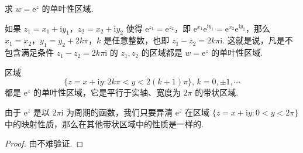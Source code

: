\documentclass[../../main.tex]{subfiles}%
\begin{document}
\begin{proposition}\label{proposition:复变函数的指数函数的单叶性区域}
求 \( w = \mathrm{e}^z \) 的单叶性区域.
\end{proposition}
\begin{solution}

如果 \( z_1 = x_1 + \mathrm{i}y_1 \)，\( z_2 = x_2 + \mathrm{i}y_2 \) 使得 \( \mathrm{e}^{z_1} = \mathrm{e}^{z_2} \)，即 \( \mathrm{e}^{x_1} \mathrm{e}^{\mathrm{i}y_1} = \mathrm{e}^{x_2} \mathrm{e}^{\mathrm{i}y_2} \)，那么 \( x_1 = x_2 \)，\( y_1 = y_2 + 2k\pi \)，\( k \) 是任意整数，也即 \( z_1 - z_2 = 2k\pi \mathrm{i} \). 这就是说，凡是不包含满足条件 \( z_1 - z_2 = 2k\pi \mathrm{i} \) 的 \( z_1, z_2 \) 的区域都是 \( w = \mathrm{e}^z \) 的单叶性区域. 

\end{solution}

\begin{proposition}
区域
\[
\{ z = x + \mathrm{i}y : 2k\pi < y < 2(k + 1)\pi \}, \, k = 0, \pm 1, \cdots
\]
都是 \( \mathrm{e}^z \) 的单叶性区域，它是平行于实轴、宽度为 \( 2\pi \) 的带状区域.
\end{proposition}
\begin{note}
由于 \( \mathrm{e}^z \) 是以 \( 2\pi \mathrm{i} \) 为周期的函数，我们只要弄清 \( \mathrm{e}^z \) 在区域 \( \{ z = x + \mathrm{i}y : 0 < y < 2\pi \} \) 中的映射性质，那么在其他带状区域中的性质是一样的.
\end{note}
\begin{proof}

由不难验证.

\end{proof}
\end{document}
